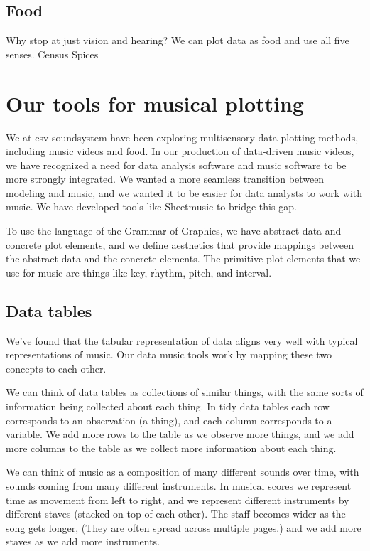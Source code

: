 \documentclass{acm_proc_article-sp}
\begin{document}
\subsection{Food}
Why stop at just vision and hearing? We can plot data as food and use
all five senses.
Census Spices

\section{Our tools for musical plotting}
We at csv soundsystem \cite{csv} have been exploring multisensory
data plotting methods, including music videos and food.
In our production of data-driven music videos, we have recognized a need
for data analysis software and music software to be more strongly integrated.
We wanted a more seamless transition between modeling and music, and we
wanted it to be easier for data analysts to work with music. We have
developed tools like Sheetmusic to bridge this gap.

To use the language of the Grammar of Graphics, \cite{XXX}
we have abstract data and concrete plot elements,
and we define aesthetics that provide mappings
between the abstract data and the concrete elements.
The primitive plot elements that we use for music are things
like key, rhythm, pitch, and interval.

\subsection{Data tables}
We've found that the tabular representation of data aligns very well with
typical representations of music. Our data music tools work by mapping these
two concepts to each other.

We can think of data tables as collections of similar things, with the
same sorts of information being collected about each thing. In tidy data
tables \cite{tidydata} each row corresponds to an observation (a thing),
and each column corresponds to a variable. We add more rows to the table
as we observe more things, and we add more columns to the table as we
collect more information about each thing.

We can think of music as a composition of many different sounds over time,
with sounds coming from many different instruments. In musical scores
we represent time as movement from left to right, and we represent different
instruments by different staves (stacked on top of each other).
The staff becomes wider as the song gets longer, (They are often spread
across multiple pages.) and we add more staves as we add more instruments.
\end{document}
